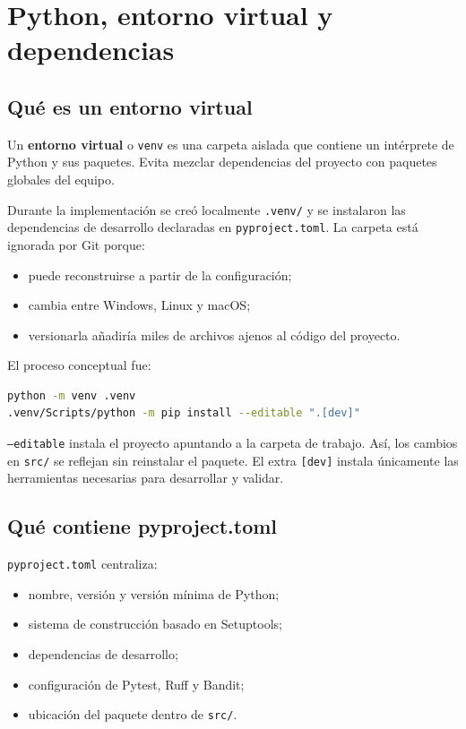 \documentclass[11pt,a4paper]{article}
\newcommand{\concepto}[1]{\textcolor{dbblue}{\textbf{#1}}}
\begin{document}
\section{Python, entorno virtual y dependencias}

\subsection{Qué es un entorno virtual}

Un \concepto{entorno virtual} o \texttt{venv} es una carpeta aislada que contiene un intérprete de
Python y sus paquetes. Evita mezclar dependencias del proyecto con paquetes globales del equipo.

Durante la implementación se creó localmente \texttt{.venv/} y se instalaron las dependencias de
desarrollo declaradas en \texttt{pyproject.toml}. La carpeta está ignorada por Git porque:

\begin{itemize}
  \item puede reconstruirse a partir de la configuración;
  \item cambia entre Windows, Linux y macOS;
  \item versionarla añadiría miles de archivos ajenos al código del proyecto.
\end{itemize}

El proceso conceptual fue:

\begin{lstlisting}[language=bash]
python -m venv .venv
.venv/Scripts/python -m pip install --editable ".[dev]"
\end{lstlisting}

\texttt{--editable} instala el proyecto apuntando a la carpeta de trabajo. Así, los cambios en
\texttt{src/} se reflejan sin reinstalar el paquete. El extra \texttt{[dev]} instala únicamente las
herramientas necesarias para desarrollar y validar.

\subsection{Qué contiene pyproject.toml}

\texttt{pyproject.toml} centraliza:

\begin{itemize}
  \item nombre, versión y versión mínima de Python;
  \item sistema de construcción basado en Setuptools;
  \item dependencias de desarrollo;
  \item configuración de Pytest, Ruff y Bandit;
  \item ubicación del paquete dentro de \texttt{src/}.
\end{itemize}
\end{document}
